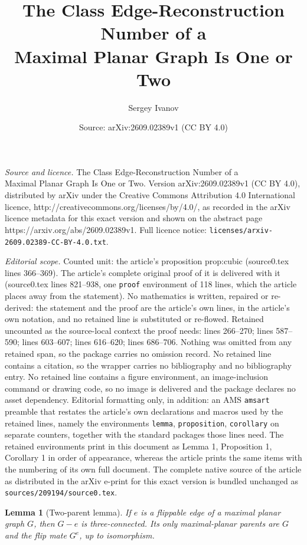 \documentclass[10pt,a4paper]{amsart}
\title{The Class Edge-Reconstruction Number of a\\ Maximal Planar Graph Is One or Two}
\author{Sergey Ivanov}
\date{Source: arXiv:2609.02389v1 (CC BY 4.0)}
\newtheorem{lemma}{Lemma}
\begin{document}
\maketitle

\noindent\emph{Source and licence.} The Class Edge-Reconstruction Number of a\\ Maximal Planar Graph Is One or Two. Version arXiv:2609.02389v1 (CC BY 4.0), distributed by arXiv under the Creative Commons Attribution 4.0 International licence, http://creativecommons.org/licenses/by/4.0/, as recorded in the arXiv licence metadata for this exact version and shown on the abstract page https://arxiv.org/abs/2609.02389v1. Full licence notice: \texttt{licenses/arxiv-2609.02389-CC-BY-4.0.txt}.\par\smallskip

\noindent\textit{Editorial scope.} Counted unit: the article's proposition prop:cubic (source0.tex lines 366--369). The article's complete original proof of it is delivered with it (source0.tex lines 821--938, one \texttt{proof} environment of 118 lines, which the article places away from the statement). No mathematics is written, repaired or re-derived: the statement and the proof are the article's own lines, in the article's own notation, and no retained line is substituted or re-flowed.  Retained uncounted as the source-local context the proof needs: lines 266--270; lines 587--590; lines 603--607; lines 616--620; lines 686--706.  Nothing was omitted from any retained span, so the package carries no omission record.  No retained line contains a citation, so the wrapper carries no bibliography and no bibliography entry.  No retained line contains a figure environment, an image-inclusion command or drawing code, so no image is delivered and the package declares no asset dependency.  Editorial formatting only, in addition: an AMS \texttt{amsart} preamble that restates the article's own declarations and macros used by the retained lines, namely the environments \texttt{lemma}, \texttt{proposition}, \texttt{corollary} on separate counters, together with the standard packages those lines need.  The retained environments print in this document as Lemma 1, Proposition 1, Corollary 1 in order of appearance, whereas the article prints the same items with the numbering of its own full document.  The complete native source of the article as distributed in the arXiv e-print for this exact version is bundled unchanged as \texttt{sources/209194/source0.tex}.
\begin{lemma}[Two-parent lemma]\label{lem:two-parent}
If \(e\) is a flippable edge of a maximal planar graph \(G\), then \(G-e\)
is three-connected.  Its only maximal-planar parents are \(G\) and the flip
mate \(G^e\), up to isomorphism.
\end{lemma}
\end{document}
